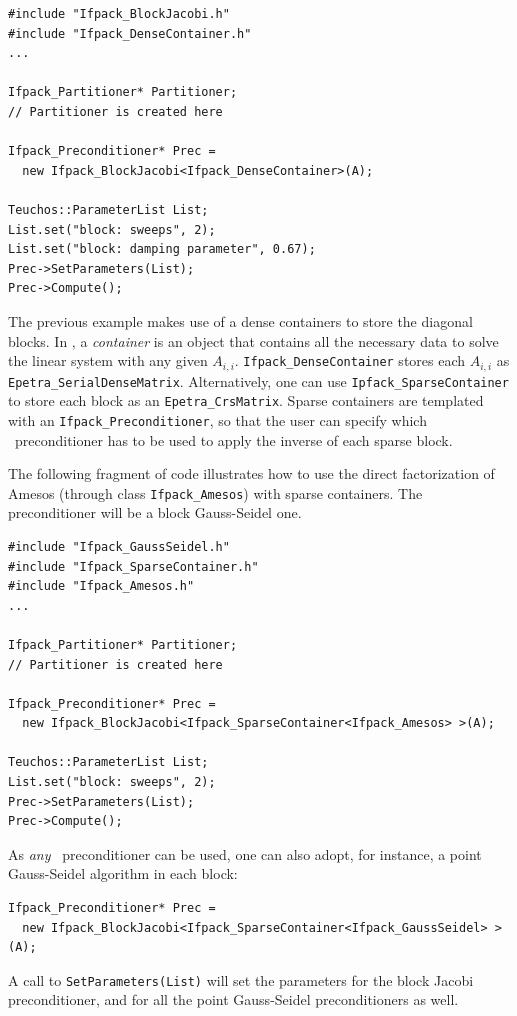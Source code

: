 \begin{verbatim}
#include "Ifpack_BlockJacobi.h"
#include "Ifpack_DenseContainer.h"
...

Ifpack_Partitioner* Partitioner;
// Partitioner is created here

Ifpack_Preconditioner* Prec =
  new Ifpack_BlockJacobi<Ifpack_DenseContainer>(A);

Teuchos::ParameterList List;
List.set("block: sweeps", 2);
List.set("block: damping parameter", 0.67);
Prec->SetParameters(List);
Prec->Compute();
\end{verbatim}
The previous example makes use of a dense containers to store
the diagonal blocks.
In \ifpack, a {\sl container} is an object that contains all the necessary
data to solve the linear system with any given $A_{i,i}$. 
\verb!Ifpack_DenseContainer! stores each $A_{i,i}$ as
\verb!Epetra_SerialDenseMatrix!. Alternatively, one can use 
\verb!Ipfack_SparseContainer! to store each block as an
\verb!Epetra_CrsMatrix!. Sparse containers are templated with an
\verb!Ifpack_Preconditioner!, so that the user can specify which \ifpack\
  preconditioner has to be used to apply the inverse of each sparse block.

The following fragment of code illustrates how to use the direct factorization
of Amesos (through class \verb!Ifpack_Amesos!) with sparse containers. The
preconditioner will be a block Gauss-Seidel one.

\begin{verbatim}
#include "Ifpack_GaussSeidel.h"
#include "Ifpack_SparseContainer.h"
#include "Ifpack_Amesos.h"
...

Ifpack_Partitioner* Partitioner;
// Partitioner is created here

Ifpack_Preconditioner* Prec =
  new Ifpack_BlockJacobi<Ifpack_SparseContainer<Ifpack_Amesos> >(A);

Teuchos::ParameterList List;
List.set("block: sweeps", 2);
Prec->SetParameters(List);
Prec->Compute();
\end{verbatim}

As {\sl any} \ifpack\ preconditioner can be used, one can also adopt, for
instance, a point Gauss-Seidel algorithm in each block:
\begin{verbatim}
Ifpack_Preconditioner* Prec =
  new Ifpack_BlockJacobi<Ifpack_SparseContainer<Ifpack_GaussSeidel> >(A);
\end{verbatim}

A call to \verb!SetParameters(List)! will set the parameters for the block
Jacobi preconditioner, and for all the point Gauss-Seidel preconditioners as
well.

